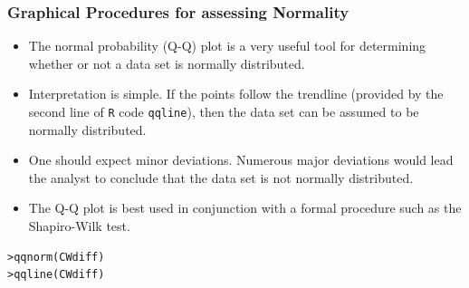 \documentclass[a4]{beamer}
\begin{document}
\begin{frame}[fragile]
\frametitle{Graphical Procedures for assessing Normality}

\begin{itemize}
\item The normal probability (Q-Q) plot is a very useful tool for determining whether or not a data set is normally distributed.
\item Interpretation is simple. If the points follow the trendline (provided by the second line of \texttt{R} code \texttt{qqline}), then the data set can be assumed to be normally distributed.
\item One should expect minor deviations. Numerous major deviations would lead the analyst to conclude that the data set is not normally distributed.
\item The Q-Q plot is best used in conjunction with a formal procedure such as the Shapiro-Wilk test.
\end{itemize}

\begin{verbatim}
>qqnorm(CWdiff)
>qqline(CWdiff)
\end{verbatim}

\end{frame}

\end{document}
